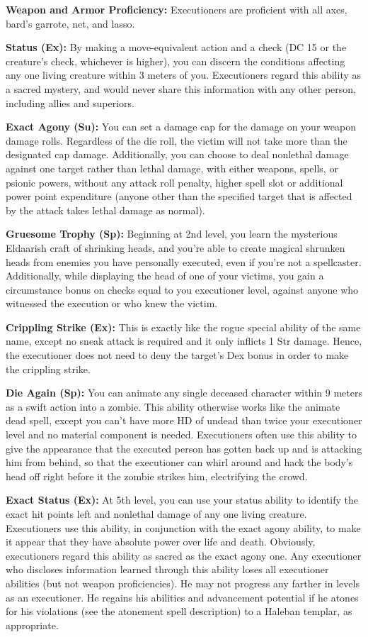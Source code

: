 {
\textbf{Weapon and Armor Proficiency:} Executioners are proficient with all axes, bard's garrote, net, and lasso.

\textbf{Status (Ex):} By making a move-equivalent action and a  check (DC 15 or the creature's  check, whichever is higher), you can discern the conditions affecting any one living creature within 3 meters of you. Executioners regard this ability as a sacred mystery, and would never share this information with any other person, including allies and superiors.

\textbf{Exact Agony (Su):} You can set a damage cap for the damage on your weapon damage rolls. Regardless of the die roll, the victim will not take more than the designated cap damage. Additionally, you can choose to deal nonlethal damage against one target rather than lethal damage, with either weapons, spells, or psionic powers, without any attack roll penalty, higher spell slot or additional power point expenditure (anyone other than the specified target that is affected by the attack takes lethal damage as normal).

\textbf{Gruesome Trophy (Sp):} Beginning at 2nd level, you learn the mysterious Eldaarish craft of shrinking heads, and you're able to create magical shrunken heads from enemies you have personally executed, even if you're not  a spellcaster. Additionally, while displaying the head of one of your victims, you gain a circumstance bonus on  checks equal to you executioner level, against anyone who witnessed the execution or who knew the victim.

\textbf{Crippling Strike (Ex):} This is exactly like the rogue special ability of the same name, except no sneak attack is required and it only inflicts 1 Str damage. Hence, the executioner does not need to deny the target's Dex bonus in order to make the crippling strike.

\textbf{Die Again (Sp):} You can animate any single deceased character within 9 meters as a swift action into a zombie. This ability otherwise works like the animate dead spell, except you can't have more HD of undead than twice your executioner level and no material component is needed. Executioners often use this ability to give the appearance that the executed person has gotten back up and is attacking him from behind, so that the executioner can whirl around and hack the body's head off right  before it the zombie strikes him, electrifying the crowd.

\textbf{Exact Status (Ex):} At 5th level, you can use your status ability to identify the exact hit points left and nonlethal damage of any one living creature. Executioners use this ability, in conjunction with the exact agony ability, to make it appear that they have absolute power over life and death. Obviously, executioners regard this ability as sacred as the exact agony one. Any executioner who discloses information learned through this ability loses all executioner abilities (but not weapon proficiencies). He may not progress any farther in levels as an executioner. He regains his abilities and advancement potential if he atones for his violations (see the atonement spell description) to a Haleban templar, as appropriate.

}
